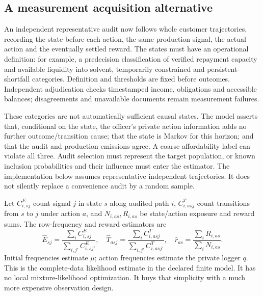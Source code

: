 \subsection{A measurement acquisition alternative}
An independent representative audit now follows whole customer trajectories,
recording the state before each action, the same production signal, the
actual action and the eventually settled reward. The states must have an
operational definition: for example, a predecision classification of verified
repayment capacity and available liquidity into solvent, temporarily
constrained and persistent-shortfall categories. Definition and thresholds
are fixed before outcomes. Independent adjudication checks timestamped
income, obligations and accessible balances; disagreements and unavailable
documents remain measurement failures.

These categories are not automatically sufficient causal states. The model
asserts that, conditional on the state, the officer's private action
information adds no further outcome/transition cause; that the state is
Markov for this horizon; and that the audit and production emissions agree.
A coarse affordability label can violate all three. Audit selection must
represent the target population, or known inclusion probabilities and their
influence must enter the estimator. The implementation below assumes
representative independent trajectories. It does not silently replace a
convenience audit by a random sample.

Let $C_{i,sj}^E$ count signal $j$ in state $s$ along audited path $i$,
$C_{i,asj}^T$ count transitions from $s$ to $j$ under action $a$, and
$N_{i,as},R_{i,as}$ be state/action exposure and reward sums. The row-frequency
and reward estimators are
\[
 \hat E_{sj}=\frac{\sum_i C_{i,sj}^E}{\sum_{i,j'}C_{i,sj'}^E},\quad
 \hat T_{asj}=\frac{\sum_i C_{i,asj}^T}{\sum_{i,j'}C_{i,asj'}^T},\quad
 \hat r_{as}=\frac{\sum_iR_{i,as}}{\sum_iN_{i,as}}.
\]
Initial frequencies estimate $\mu$; action frequencies estimate the private
logger $q$. This is the complete-data likelihood estimate in the declared
finite model. It has no local mixture-likelihood optimization. It buys that
simplicity with a much more expensive observation design.


